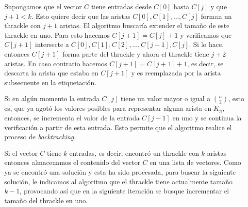   Supongamos que el vector $C$ tiene entradas desde $C[0]$ hasta $C[j]$ y que
  $j+1 < k$. Esto quiere decir que las aristas $C[0],C[1],\dots,C[j]$ forman un
  thrackle con $j+1$ aristas. El algoritmo buscaría extender el tamaño de este
  thrackle en uno. Para esto hacemos $C[j+1]=C[j]+1$ y verificamos que $C[j+1]$
  intersecte a $C[0],C[1],C[2],\dots,C[j-1],C[j]$. Si lo hace, entonces
  $C[j+1]$ forma parte del thrackle y ahora el thrackle tiene $j+2$ aristas. En
  caso contrario hacemos $C[j+1]=C[j+1]+1$, es decir, se descarta la arista que
  estaba en $C[j+1]$ y es reemplazada por la arista subsecuente en la
  etiquetación.

  Si en algún momento la entrada $C[j]$ tiene un valor mayor o igual a
  $\binom{n}{2}$, esto es, que ya agotó los valores posibles para representar
  alguna arista en $K_n$, entonces, se incrementa el valor de la entrada
  $C[j-1]$ en uno y se continua la verificación a partir de esta entrada. Esto
  permite que el algoritmo realice el proceso de \emph{backtracking}.

  Si el vector $C$ tiene $k$ entradas, es decir, encontró un thrackle con $k$
  aristas entonces almacenamos el contenido del vector $C$ en una lista de
  vectores. Como ya se encontró una solución y esta ha sido procesada, para
  buscar la siguiente solución, le indicamos al algoritmo que el thrackle tiene
  actualmente tamaño $k-1$, provocando así que en la siguiente iteración se
  busque incrementar el tamaño del thrackle en uno.


